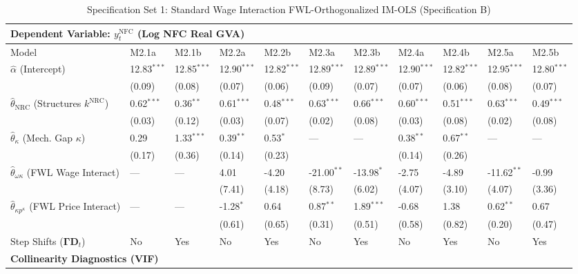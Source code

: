 \begin{table}[H]
\centering
\setlength{\tabcolsep}{2.5pt}
\caption{Specification Set 1: Standard Wage Interaction FWL-Orthogonalized IM-OLS (Specification B)}
\label{tab:specB_set1}
\scriptsize
\begin{tabular}{p{3.8cm}p{1.1cm}p{1.1cm}p{1.1cm}p{1.1cm}p{1.1cm}p{1.1cm}p{1.1cm}p{1.1cm}p{1.1cm}p{1.1cm}}
\toprule
\multicolumn{11}{l}{\textbf{Dependent Variable: $y_t^{\text{NFC}}$ (Log NFC Real GVA)}} \\
\midrule
Model & M2.1a & M2.1b & M2.2a & M2.2b & M2.3a & M2.3b & M2.4a & M2.4b & M2.5a & M2.5b \\
\midrule
$\hat{\alpha}$ (Intercept) & 12.83$^{***}$ & 12.85$^{***}$ & 12.90$^{***}$ & 12.82$^{***}$ & 12.89$^{***}$ & 12.89$^{***}$ & 12.90$^{***}$ & 12.82$^{***}$ & 12.95$^{***}$ & 12.80$^{***}$ \\
 & (0.09) & (0.08) & (0.07) & (0.06) & (0.09) & (0.07) & (0.07) & (0.06) & (0.08) & (0.07) \\
$\hat{\theta}_{\text{NRC}}$ (Structures $k^{\text{NRC}}$) & 0.62$^{***}$ & 0.36$^{**}$ & 0.61$^{***}$ & 0.48$^{***}$ & 0.63$^{***}$ & 0.66$^{***}$ & 0.60$^{***}$ & 0.51$^{***}$ & 0.63$^{***}$ & 0.49$^{***}$ \\
 & (0.03) & (0.12) & (0.03) & (0.07) & (0.02) & (0.08) & (0.03) & (0.08) & (0.02) & (0.08) \\
$\hat{\theta}_{\kappa}$ (Mech. Gap $\kappa$) & 0.29 & 1.33$^{***}$ & 0.39$^{**}$ & 0.53$^{*}$ & --- & --- & 0.38$^{**}$ & 0.67$^{**}$ & --- & --- \\
 & (0.17) & (0.36) & (0.14) & (0.23) &  &  & (0.14) & (0.26) &  &  \\
$\hat{\theta}_{\omega\kappa}$ (FWL Wage Interact) & --- & --- & 4.01 & -4.20 & -21.00$^{**}$ & -13.98$^{*}$ & -2.75 & -4.89 & -11.62$^{**}$ & -0.99 \\
 &  &  & (7.41) & (4.18) & (8.73) & (6.02) & (4.07) & (3.10) & (4.07) & (3.36) \\
$\hat{\theta}_{\kappa p^{\kappa}}$ (FWL Price Interact) & --- & --- & -1.28$^{*}$ & 0.64 & 0.87$^{**}$ & 1.89$^{***}$ & -0.68 & 1.38 & 0.62$^{**}$ & 0.67 \\
 &  &  & (0.61) & (0.65) & (0.31) & (0.51) & (0.58) & (0.82) & (0.20) & (0.47) \\
Step Shifts ($\boldsymbol{\Gamma} \mathbf{D}_t$) & No & Yes & No & Yes & No & Yes & No & Yes & No & Yes \\
\midrule
\multicolumn{11}{l}{\textbf{Collinearity Diagnostics (VIF)}} \\

\end{tabular}
\end{table}
